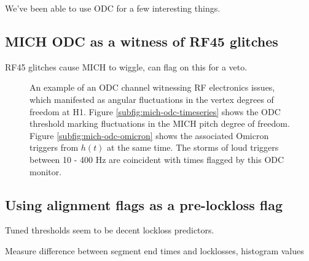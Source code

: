 We've been able to use ODC for a few interesting things.

\subsection{MICH ODC as a witness of RF45 glitches}

RF45 glitches cause MICH to wiggle, can flag on this for a veto. 

\begin{figure}[ht!]%

\caption[ODC threshold on MICH pitch]{%
         An example of an ODC channel witnessing RF electronics issues, which %
         manifested as angular fluctuations in the vertex degrees of freedom %
         at H1. Figure \ref{subfig:mich-odc-timeseries} shows the ODC threshold %
         marking fluctuations in the MICH pitch degree of freedom. Figure %
         \ref{subfig:mich-odc-omicron} shows the associated Omicron triggers from %
         $h(t)$ at the same time. The storms of loud triggers between 10 - 400 Hz %
         are coincident with times flagged by this ODC monitor.}
\end{figure}\label{fig:mich-odc-example}

\subsection{Using alignment flags as a pre-lockloss flag}

Tuned thresholds seem to be decent lockloss predictors.

Measure difference between segment end times and locklosses, histogram values



